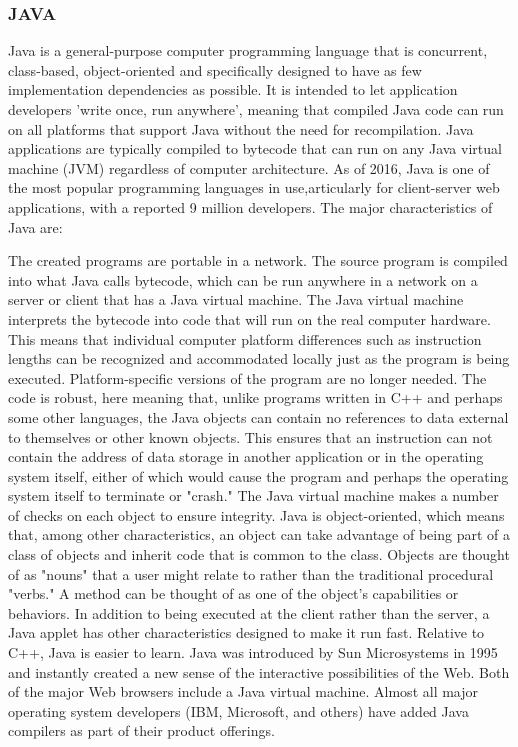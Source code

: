 \documentclass[12pt]{article}
\begin{document}
\newpage
\subsubsection{JAVA}
	Java is a general-purpose computer programming language that is concurrent, class-based, object-oriented and specifically designed to have as few implementation dependencies as possible. It is intended to let application developers 'write once, run anywhere', meaning that compiled Java code can run on all platforms that support Java without the need for recompilation. Java applications are typically compiled to bytecode that can run on any Java virtual machine (JVM) regardless of computer architecture. As of 2016, Java is one of the most popular programming languages in use,articularly for client-server web applications, with a reported 9 million developers.
	 The major characteristics of Java are:

    The created programs are portable in a network. The source program is compiled into what Java calls bytecode, which can be run anywhere in a network on a server or client that has a Java virtual machine. The Java virtual machine interprets the bytecode into code that will run on the real computer hardware. This means that individual computer platform differences such as instruction lengths can be recognized and accommodated locally just as the program is being executed. Platform-specific versions of the program are no longer needed.
    The code is robust, here meaning that, unlike programs written in C++ and perhaps some other languages, the Java objects can contain no references to data external to themselves or other known objects. This ensures that an instruction can not contain the address of data storage in another application or in the operating system itself, either of which would cause the program and perhaps the operating system itself to terminate or "crash." The Java virtual machine makes a number of checks on each object to ensure integrity.
    Java is object-oriented, which means that, among other characteristics, an object can take advantage of being part of a class of objects and inherit code that is common to the class. Objects are thought of as "nouns" that a user might relate to rather than the traditional procedural "verbs." A method can be thought of as one of the object's capabilities or behaviors.
    In addition to being executed at the client rather than the server, a Java applet has other characteristics designed to make it run fast.
    Relative to C++, Java is easier to learn.
    Java was introduced by Sun Microsystems in 1995 and instantly created a new sense of the interactive possibilities of the Web. Both of the major Web browsers include a Java virtual machine. Almost all major operating system developers (IBM, Microsoft, and others) have added Java compilers as part of their product offerings.
\end{document}
